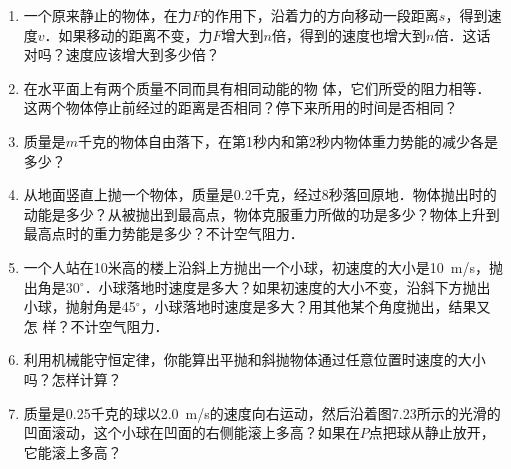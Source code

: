 \begin{exercises}
\begin{enumerate}
    \item 一个原来静止的物体，在力$F$的作用下，沿着力的方向移动一段距离$s$，得到速度$v$．如果移动的距离不变，力$F$增大到$n$倍，得到的速度也增大到$n$倍．这话对吗？速度应该增大到多少倍？
    \item 在水平面上有两个质量不同而具有相同动能的物
          体，它们所受的阻力相等．这两个物体停止前经过的距离是否相同？停下来所用的时间是否相同？
    \item 质量是$m$千克的物体自由落下，在第1秒内和第2秒内物体重力势能的减少各是多少？
    \item 从地面竖直上抛一个物体，质量是0.2千克，经过8秒落回原地．物体抛出时的动能是多少？从被抛出到最高点，物体克服重力所做的功是多少？物体上升到最高点时的重力势能是多少？不计空气阻力．
    \item 一个人站在10米高的楼上沿斜上方抛出一个小球，初速度的大小是\qty{10}{m/s}，抛出角是30$^\circ$．小球落地时速度是多大？如果初速度的大小不变，沿斜下方抛出小球，抛射角是45$^\circ$，小球落地时速度是多大？用其他某个角度抛出，结果又怎
          样？不计空气阻力．
    \item 利用机械能守恒定律，你能算出平抛和斜抛物体通过任意位置时速度的大小吗？怎样计算？
    \item 质量是0.25千克的球以\qty{2.0}{m/s}的速度向右运动，然后沿着图7.23所示的光滑的凹面滚动，这个小球在凹面的右侧能滚上多高？如果在$P$点把球从静止放开，它能滚上多高？
          \begin{figure}[H]\centering
              \caption{}
          \end{figure}


\end{enumerate}
\end{exercises}
